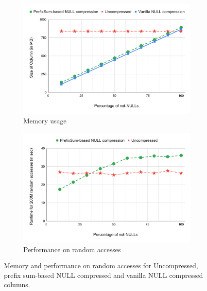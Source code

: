 \begin{figure}
	\hspace*{-25pt}
	\begin{subfigure}{0.55\textwidth}
		\centering
		\includegraphics[scale=0.30]{img/pref-space}
		\captionsetup{justification=centering}
		\caption{Memory usage}
		\label{fig:pref-space}
	\end{subfigure}
	\begin{subfigure}{0.55\textwidth}
		\centering
		\includegraphics[scale=0.30]{img/pref-perf}
		\captionsetup{justification=centering}
		\caption{Performance on random accesses}
		\label{fig:pref-perf}
	\end{subfigure}
	\captionsetup{justification=centering}
	\caption{Memory and performance on random accesses for Uncompressed, prefix sum-based NULL compressed and vanilla NULL compressed columns.}
	\label{fig:pref-stress}
\end{figure}

